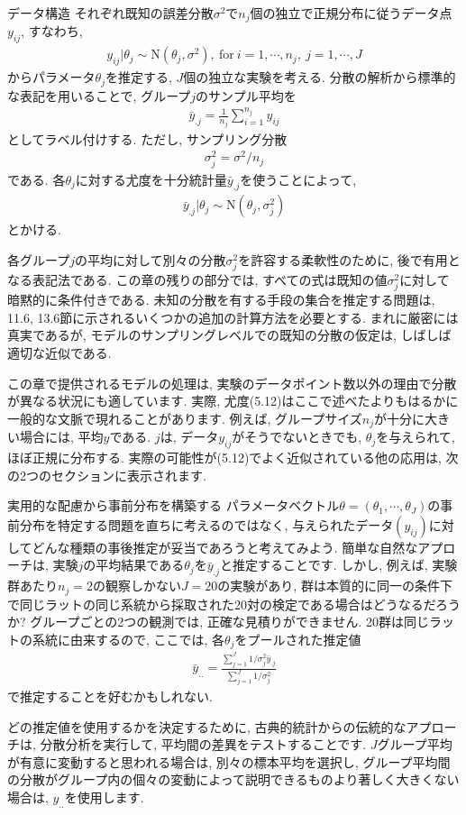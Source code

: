 \documentclass[10pt,dvipdfmx,a4]{beamer}
\newcommand{\eq}[1]{\begin{align}#1\end{align}}
\newcommand{\eqn}[1]{\begin{align*}#1\end{align*}}
\begin{document}
\begin{frame}{データ構造}
それぞれ既知の誤差分散$\sigma^2$で$n_j$個の独立で正規分布に従うデータ点$y_{ij}$, すなわち,
\eq{y_{ij}|\theta_j\sim \text{N}(\theta_j,\sigma^2),\ \text{for}\ i=1,\cdots,n_j,\ j=1,\cdots,J}
からパラメータ$\theta_j$を推定する, $J$個の独立な実験を考える.
分散の解析から標準的な表記を用いることで, グループ$j$のサンプル平均を
\eqn{\bar{y}_{.j}=\frac{1}{n_j}\sum_{i=1}^{n_j} y_{ij}}
としてラベル付けする.
ただし, サンプリング分散
\eqn{\sigma_j^2=\sigma^2/n_j}
である.
各$\theta_j$に対する尤度を十分統計量$\bar{y}_{.j}$を使うことによって,
\eq{\bar{y}_{.j}|\theta_j\sim\text{N}(\theta_j,\sigma_j^2)}
とかける.
\end{frame}


\begin{frame}
各グループ$j$の平均に対して別々の分散$\sigma^2_j$を許容する柔軟性のために, 後で有用となる表記法である.
この章の残りの部分では, すべての式は既知の値$\sigma^2_j$に対して暗黙的に条件付きである.
未知の分散を有する手段の集合を推定する問題は, 11.6, 13.6節に示されるいくつかの追加の計算方法を必要とする.
まれに厳密には真実であるが, モデルのサンプリングレベルでの既知の分散の仮定は, しばしば適切な近似である.

この章で提供されるモデルの処理は, 実験のデータポイント数以外の理由で分散が異なる状況にも適しています.
実際, 尤度(5.12)はここで述べたよりもはるかに一般的な文脈で現れることがあります.
例えば, グループサイズ$n_j$が十分に大きい場合には, 平均$y$である.
$j$は, データ$y_{ij}$がそうでないときでも, $\theta_j$を与えられて, ほぼ正規に分布する.
実際の可能性が(5.12)でよく近似されている他の応用は, 次の2つのセクションに表示されます.
\end{frame}


\begin{frame}{実用的な配慮から事前分布を構築する}
パラメータベクトル$\theta=(\theta_1,\cdots,\theta_J)$の事前分布を特定する問題を直ちに考えるのではなく, 与えられたデータ$(y_{ij})$に対してどんな種類の事後推定が妥当であろうと考えてみよう.
簡単な自然なアプローチは, 実験$j$の平均結果である$\theta_j$を$\bar{y}_{.j}$と推定することです.
しかし, 例えば, 実験群あたり$n_j=2$の観察しかない$J=20$の実験があり, 群は本質的に同一の条件下で同じラットの同じ系統から採取された20対の検定である場合はどうなるだろうか?
グループごとの2つの観測では, 正確な見積りができません.
20群は同じラットの系統に由来するので, ここでは, 各$\theta_j$をプールされた推定値
\eq{\bar{y}_{..}=\tfrac{\sum_{j=1}^J1/\sigma^2_j\bar{y}_{.j}}{\sum_{j=1}^J1/\sigma_j^2}}
で推定することを好むかもしれない.

どの推定値を使用するかを決定するために, 古典的統計からの伝統的なアプローチは, 分散分析を実行して, 平均間の差異をテストすることです.
$J$グループ平均が有意に変動すると思われる場合は, 別々の標本平均を選択し, グループ平均間の分散がグループ内の個々の変動によって説明できるものより著しく大きくない場合は, $y_{..}$を使用します.
\end{frame}
\end{document}
